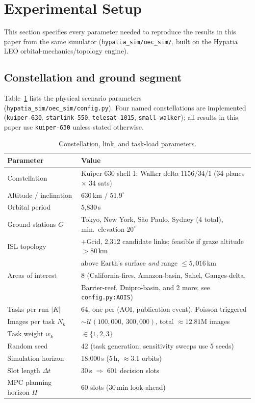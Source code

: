 \section{Experimental Setup}
\label{sec:setup}

This section specifies every parameter needed to reproduce the results in
this paper from the same simulator (\texttt{hypatia\_sim/oec\_sim/}, built on
the Hypatia LEO orbital-mechanics/topology engine).

\subsection{Constellation and ground segment}

Table~\ref{tab:constellation} lists the physical scenario parameters
(\texttt{hypatia\_sim/oec\_sim/config.py}). Four named constellations are
implemented (\texttt{kuiper-630}, \texttt{starlink-550}, \texttt{telesat-1015},
\texttt{small-walker}); all results in this paper use \texttt{kuiper-630}
unless stated otherwise.

\begin{table}[h]
\centering
\caption{Constellation, link, and task-load parameters.}
\label{tab:constellation}
\begin{tabular}{ll}
\toprule
Parameter & Value \\
\midrule
Constellation & Kuiper-630 shell 1: Walker-delta $1156/34/1$ (34 planes $\times$ 34 sats) \\
Altitude / inclination & 630\,km / $51.9^\circ$ \\
Orbital period & 5{,}830\,s \\
Ground stations $G$ & Tokyo, New York, S\~ao Paulo, Sydney (4 total), min.\ elevation $20^\circ$ \\
ISL topology & +Grid, 2{,}312 candidate links; feasible if graze altitude $>80$\,km \\
             & above Earth's surface \emph{and} range $\le 5{,}016$\,km \\
Areas of interest & 8 (California-fires, Amazon-basin, Sahel, Ganges-delta, \\
                   & Barrier-reef, Dnipro-basin, and 2 more; see \texttt{config.py:AOIS}) \\
Tasks per run $|K|$ & 64, one per (AOI, publication event), Poisson-triggered \\
Images per task $N_k$ & $\sim \mathcal{U}(100{,}000,\ 300{,}000)$, total $\approx 12.81$M images \\
Task weight $w_k$ & $\in \{1, 2, 3\}$ \\
Random seed & 42 (task generation; sensitivity sweeps use 5 seeds) \\
Simulation horizon & 18{,}000\,s (5\,h, $\approx 3.1$ orbits) \\
Slot length $\Delta t$ & 30\,s $\Rightarrow$ 601 decision slots \\
MPC planning horizon $H$ & 60 slots (30\,min look-ahead) \\
\bottomrule
\end{tabular}
\end{table}

